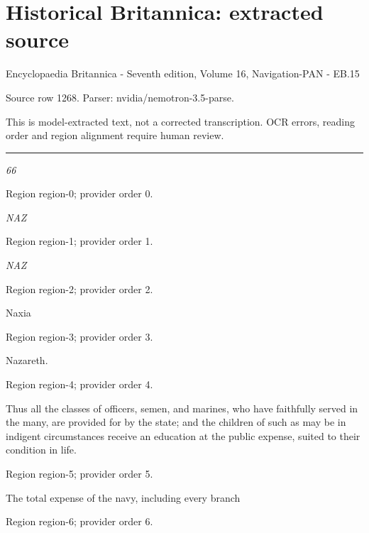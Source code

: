 \documentclass[11pt]{article}
\begin{document}
\section*{Historical Britannica: extracted source}
Encyclopaedia Britannica - Seventh edition, Volume 16, Navigation-PAN - EB.15\par
{\small Source row 1268. Parser: nvidia/nemotron-3.5-parse.\par}
{\small This is model-extracted text, not a corrected transcription. OCR errors, reading order and region alignment require human review.\par}
\hrule\medskip
{\small\itshape 66\par}

{\scriptsize\color{gray} Region region-0; provider order 0.\par}
\medskip

{\small\itshape NAZ\par}

{\scriptsize\color{gray} Region region-1; provider order 1.\par}
\medskip

{\small\itshape NAZ\par}

{\scriptsize\color{gray} Region region-2; provider order 2.\par}
\medskip

Naxia
\par

{\scriptsize\color{gray} Region region-3; provider order 3.\par}
\medskip

Nazareth.
\par

{\scriptsize\color{gray} Region region-4; provider order 4.\par}
\medskip

Thus all the classes of officers, semen, and marines, who have faithfully served in the many, are provided for by the state; and the children of such as may be in indigent circumstances receive an education at the public expense, suited to their condition in life.
\par

{\scriptsize\color{gray} Region region-5; provider order 5.\par}
\medskip

The total expense of the navy, including every branch
\par

{\scriptsize\color{gray} Region region-6; provider order 6.\par}
\medskip
\end{document}
